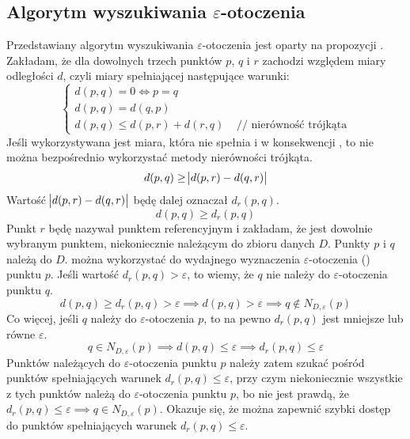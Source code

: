 \subsection{Algorytm wyszukiwania $\varepsilon$-otoczenia}
Przedstawiany algorytm wyszukiwania $\varepsilon$-otoczenia jest oparty na propozycji \cite{tidbscan}. Zakładam, że dla dowolnych trzech punktów $ p $, $ q $ i $ r $ zachodzi  względem miary odległości $ d $, czyli miary spełniającej następujące warunki:
\begin{equation} \label{eq:metric}
	\left\{\begin{array}{l}
		d(p,q)=0 \iff p=q \\
		d(p,q)=d(q,p) \\
		d(p,q)\leq d(p,r) + d(r,q) \;\;\;\;\text{// nierówność trójkąta}
	\end{array}\right.
\end{equation}
Jeśli wykorzystywana jest miara, która nie spełnia  i w konsekwencji , to nie można bezpośrednio wykorzystać metody nierówności trójkąta.
\begin{equation}\label{eq:ti-raw}
	d(p,q) \ge \abs{d(p,r)-d(q,r)}
\end{equation}
Wartość $\abs{ d(p,r) - d(q,r) }$ będę dalej oznaczał $ d_r(p,q) $.
\begin{equation}\label{eq:ti}
	d(p,q) \ge d_r(p,q)
\end{equation}
 Punkt $ r $ będę nazywał punktem referencyjnym i zakładam, że jest dowolnie wybranym punktem, niekoniecznie należącym do zbioru danych $ D $. Punkty $ p $ i $ q $ należą do $ D $.  można wykorzystać do wydajnego wyznaczenia $ \varepsilon $-otoczenia () punktu $ p $. Jeśli wartość $ d_r(p,q) > \varepsilon $, to wiemy, że $ q $ nie należy do $ \varepsilon $-otoczenia punktu $ q $.
\begin{equation}
	d(p,q) \ge d_r(p,q) > \varepsilon \implies d(p,q) > \varepsilon \implies q \notin N_{D,\varepsilon}(p)
\end{equation}
Co więcej, jeśli $ q $ należy do $ \varepsilon $-otoczenia $ p $, to na pewno $ d_r(p,q) $ jest mniejsze lub równe $ \varepsilon $.
\begin{equation}
	q \in N_{D,\varepsilon}(p) \implies d(p,q) \le \varepsilon \implies d_r(p,q) \le \varepsilon
\end{equation}
Punktów należących do $ \varepsilon $-otoczenia punktu $ p $ należy zatem szukać pośród punktów spełniających warunek $ d_r(p,q) \le \varepsilon $, przy czym niekoniecznie wszystkie z tych punktów należą do $ \varepsilon $-otoczenia punktu $ p $, bo nie jest prawdą, że $ d_r(p,q) \le \varepsilon \implies q \in N_{D,\varepsilon}(p)$. Okazuje się, że można zapewnić szybki dostęp do punktów spełniających warunek $ d_r(p,q) \le \varepsilon $.
